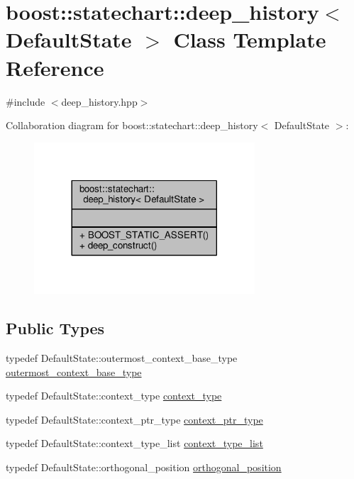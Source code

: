 \hypertarget{classboost_1_1statechart_1_1deep__history}{}\section{boost\+:\+:statechart\+:\+:deep\+\_\+history$<$ Default\+State $>$ Class Template Reference}
\label{classboost_1_1statechart_1_1deep__history}


{\ttfamily \#include $<$deep\+\_\+history.\+hpp$>$}



Collaboration diagram for boost\+:\+:statechart\+:\+:deep\+\_\+history$<$ Default\+State $>$\+:
\nopagebreak
\begin{figure}[H]
\begin{center}
\leavevmode
\includegraphics[width=233pt]{classboost_1_1statechart_1_1deep__history__coll__graph}
\end{center}
\end{figure}
\subsection*{Public Types}
\begin{DoxyCompactItemize}
\item 
typedef Default\+State\+::outermost\+\_\+context\+\_\+base\+\_\+type \mbox{\hyperlink{classboost_1_1statechart_1_1deep__history_a2ce3a43f840db416420a3073071c22cc}{outermost\+\_\+context\+\_\+base\+\_\+type}}
\item 
typedef Default\+State\+::context\+\_\+type \mbox{\hyperlink{classboost_1_1statechart_1_1deep__history_a1c07f8bbd723d19c6b063e688276d25e}{context\+\_\+type}}
\item 
typedef Default\+State\+::context\+\_\+ptr\+\_\+type \mbox{\hyperlink{classboost_1_1statechart_1_1deep__history_a0b936dd258f9807e4f3901096c289033}{context\+\_\+ptr\+\_\+type}}
\item 
typedef Default\+State\+::context\+\_\+type\+\_\+list \mbox{\hyperlink{classboost_1_1statechart_1_1deep__history_abd6a65998227174ac9e8612ed55d4674}{context\+\_\+type\+\_\+list}}
\item 
typedef Default\+State\+::orthogonal\+\_\+position \mbox{\hyperlink{classboost_1_1statechart_1_1deep__history_ad0f4db179ac7777d12822e93a9023699}{orthogonal\+\_\+position}}
\end{DoxyCompactItemize}

